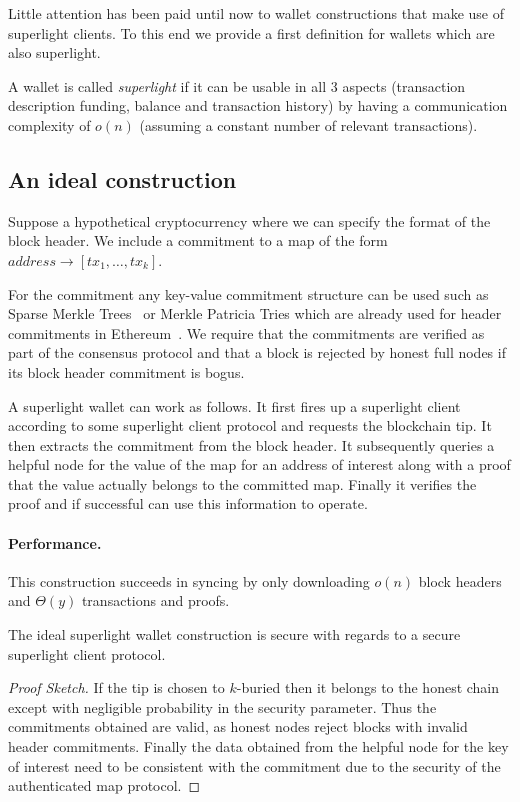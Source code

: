 Little attention has been paid until now to wallet constructions that make use of superlight clients. To this end we provide a first definition for wallets which are also superlight.

\begin{definition}
A wallet is called \emph{superlight} if it can be usable in all 3 aspects (transaction description funding, balance and transaction history) by having a communication complexity of $o(n)$ (assuming a constant number of relevant transactions).
\end{definition}

\subsection{An ideal construction}
\label{superlight-ideal}
Suppose a hypothetical cryptocurrency where we can specify the format of the block header. We include a commitment to a map of the form $address \rightarrow [tx_1, \dots, tx_k]$.

For the commitment any key-value commitment structure can be used such as Sparse Merkle Trees~\cite{sparse-mt,revocation-transparency} or Merkle Patricia Tries which are already used for header commitments in Ethereum~\cite{wood2014ethereum}. We require that the commitments are verified as part of the consensus protocol and that a block is rejected by honest full nodes if its block header commitment is bogus.

A superlight wallet can work as follows. It first fires up a superlight client according to some superlight client protocol and requests the blockchain tip. It then extracts the commitment from the block header. It subsequently queries a helpful node for the value of the map for an address of interest along with a proof that the value actually belongs to the committed map. Finally it verifies the proof and if successful can use this information to operate.

\paragraph{Performance.} This construction succeeds in syncing by only downloading $o(n)$ block headers and $\Theta(y)$ transactions and proofs.
\begin{theorem}[Security]
The ideal superlight wallet construction is secure with regards to a secure superlight client protocol.
\end{theorem}
\begin{proof}[Proof Sketch]
If the tip is chosen to $k$-buried then it belongs to the honest chain except with negligible probability in the security parameter. Thus the commitments obtained are valid, as honest nodes reject blocks with invalid header commitments. Finally the data obtained from the helpful node for the key of interest need to be consistent with the commitment due to the security of the authenticated map protocol.
\end{proof}

